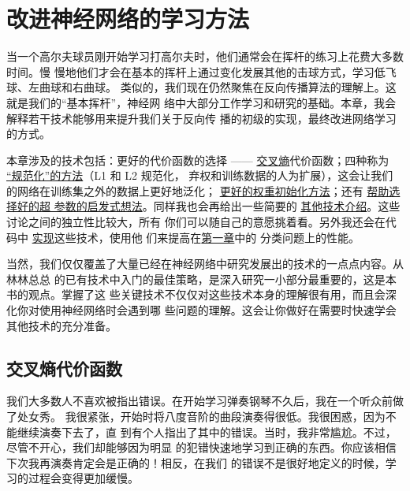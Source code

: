 
\chapter{改进神经网络的学习方法}
\label{ch:ImprovingTheWayNeuralNetworksLearn}

当一个高尔夫球员刚开始学习打高尔夫时，他们通常会在挥杆的练习上花费大多数时间。慢
慢地他们才会在基本的挥杆上通过变化发展其他的击球方式，学习低飞球、左曲球和右曲球。
类似的，我们现在仍然聚焦在反向传播算法的理解上。这就是我们的“基本挥杆”，神经网
络中大部分工作学习和研究的基础。本章，我会解释若干技术能够用来提升我们关于反向传
播的初级的实现，最终改进网络学习的方式。

本章涉及的技术包括：更好的代价函数的选择 ——
\hyperref[sec:the_cross-entropy_cost_function]{交叉熵}代价函数；四种称为%
\hyperref[sec:overfitting_and_regularization]{“规范化”的方法}（L1 和 L2 规范化，
  弃权和训练数据的人为扩展），这会让我们的网络在训练集之外的数据上更好地泛化；%
\hyperref[sec:weight_initialization]{更好的权重初始化方法}；还有%
\hyperref[sec:how_to_choose_a_neural_network's_hyper-parameters]{帮助选择好的超
  参数的启发式想法}。同样我也会再给出一些简要的%
\hyperref[sec:other_techniques]{其他技术介绍}。这些讨论之间的独立性比较大，所有
你们可以随自己的意愿挑着看。另外我还会在代码中%
\hyperref[sec:handwriting_recognition_revisited_the_code]{实现}这些技术，使用他
们来提高在\hyperref[ch:UsingNeuralNetsToRecognizeHandwrittenDigits]{第一章}中的
分类问题上的性能。

当然，我们仅仅覆盖了大量已经在神经网络中研究发展出的技术的一点点内容。从林林总总
的已有技术中入门的最佳策略，是深入研究一小部分最重要的，这是本书的观点。掌握了这
些关键技术不仅仅对这些技术本身的理解很有用，而且会深化你对使用神经网络时会遇到哪
些问题的理解。这会让你做好在需要时快速学会其他技术的充分准备。

\section{交叉熵代价函数}
\label{sec:the_cross-entropy_cost_function}

我们大多数人不喜欢被指出错误。在开始学习弹奏钢琴不久后，我在一个听众前做了处女秀。
我很紧张，开始时将八度音阶的曲段演奏得很低。我很困惑，因为不能继续演奏下去了，直
到有个人指出了其中的错误。当时，我非常尴尬。不过，尽管不开心，我们却能够因为明显
的犯错快速地学习到正确的东西。你应该相信下次我再演奏肯定会是正确的！相反，在我们
的错误不是很好地定义的时候，学习的过程会变得更加缓慢。


